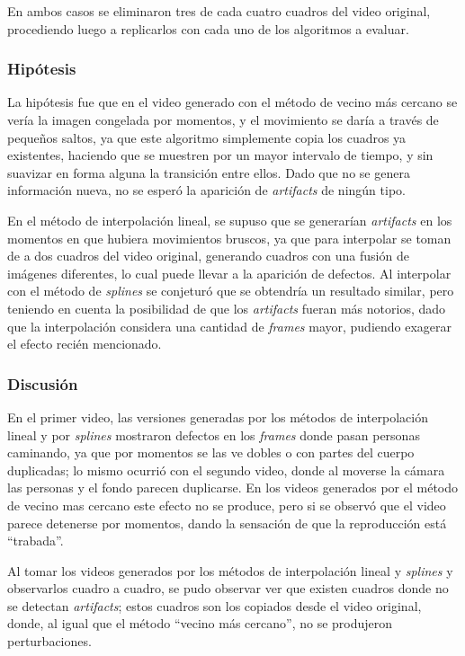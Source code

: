                 En ambos casos se eliminaron tres de cada cuatro cuadros del video original, procediendo luego a replicarlos con cada uno de los algoritmos a evaluar.

            \subsubsection*{Hipótesis}

                La hipótesis fue que en el video generado con el método de vecino más cercano se vería la imagen congelada por momentos, y el movimiento se daría a través de pequeños saltos, ya que este algoritmo simplemente copia los cuadros ya existentes, haciendo que se muestren por un mayor intervalo de tiempo, y sin suavizar en forma alguna la transición entre ellos. Dado que no se genera información nueva, no se esperó la aparición de \emph{artifacts} de ningún tipo.

                En el método de interpolación lineal, se supuso que se generarían \emph{artifacts} en los momentos en que hubiera movimientos bruscos, ya que para interpolar se toman de a dos cuadros del video original, generando cuadros con una fusión de imágenes diferentes, lo cual puede llevar a la aparición de defectos. Al interpolar con el método de \emph{splines} se conjeturó que se obtendría un resultado similar, pero teniendo en cuenta la posibilidad de que los \emph{artifacts} fueran más notorios, dado que la interpolación considera una cantidad de \emph{frames} mayor, pudiendo exagerar el efecto recién mencionado.


            \subsubsection*{Discusión}

                En el primer video, las versiones generadas por los métodos de interpolación lineal y por \emph{splines} mostraron defectos en los \emph{frames} donde pasan personas caminando, ya que por momentos se las ve dobles o con partes del cuerpo duplicadas; lo mismo ocurrió con el segundo video, donde al moverse la cámara las personas y el fondo parecen duplicarse. En los videos generados por el método de vecino mas cercano este efecto no se produce, pero si se observó que el video parece detenerse por momentos, dando la sensación de que la reproducción está ``trabada''.

                Al tomar los videos generados por los métodos de interpolación lineal y \emph{splines} y observarlos cuadro a cuadro, se pudo observar ver que existen cuadros donde no se detectan \emph{artifacts}; estos cuadros son los copiados desde el video original, donde, al igual que el método ``vecino más cercano'', no se produjeron perturbaciones.
